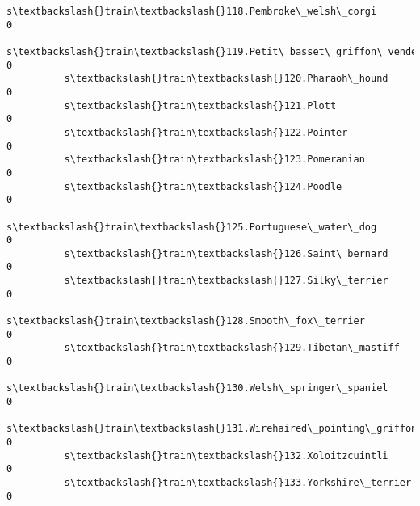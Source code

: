 \documentclass[11pt]{article}
\begin{document}
\begin{Verbatim}[commandchars=\\\{\}]
          s\textbackslash{}train\textbackslash{}118.Pembroke\_welsh\_corgi                                       0   
          s\textbackslash{}train\textbackslash{}119.Petit\_basset\_griffon\_vendeen                               0   
          s\textbackslash{}train\textbackslash{}120.Pharaoh\_hound                                              0   
          s\textbackslash{}train\textbackslash{}121.Plott                                                      0   
          s\textbackslash{}train\textbackslash{}122.Pointer                                                    0   
          s\textbackslash{}train\textbackslash{}123.Pomeranian                                                 0   
          s\textbackslash{}train\textbackslash{}124.Poodle                                                     0   
          s\textbackslash{}train\textbackslash{}125.Portuguese\_water\_dog                                       0   
          s\textbackslash{}train\textbackslash{}126.Saint\_bernard                                              0   
          s\textbackslash{}train\textbackslash{}127.Silky\_terrier                                              0   
          s\textbackslash{}train\textbackslash{}128.Smooth\_fox\_terrier                                         0   
          s\textbackslash{}train\textbackslash{}129.Tibetan\_mastiff                                            0   
          s\textbackslash{}train\textbackslash{}130.Welsh\_springer\_spaniel                                     0   
          s\textbackslash{}train\textbackslash{}131.Wirehaired\_pointing\_griffon                                0   
          s\textbackslash{}train\textbackslash{}132.Xoloitzcuintli                                             0   
          s\textbackslash{}train\textbackslash{}133.Yorkshire\_terrier                                          0   
          

\end{Verbatim}
\end{document}
